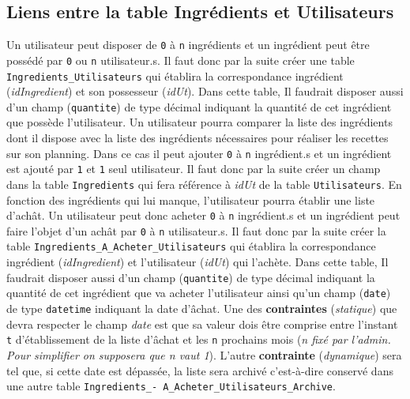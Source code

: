 \subsection{Liens entre la table Ingrédients et Utilisateurs}
Un utilisateur peut disposer de \texttt{0} à \texttt{n} ingrédients et un ingrédient peut être possédé par \texttt{0} ou \texttt{n} utilisateur.s. Il faut donc par la suite créer une table \texttt{Ingredients\_Utilisateurs} qui établira la correspondance ingrédient (\textit{idIngredient}) et son possesseur (\textit{idUt}).
Dans cette table, Il faudrait disposer aussi d'un champ (\texttt{quantite}) de type décimal indiquant la quantité de cet ingrédient que possède l'utilisateur.
\newline
Un utilisateur pourra comparer la liste des ingrédients dont il dispose avec la liste des ingrédients nécessaires pour réaliser les recettes sur son planning. Dans ce cas il peut ajouter \texttt{0} à \texttt{n} ingrédient.s et un ingrédient est ajouté par \texttt{1} et \texttt{1} seul utilisateur. 
\newline
Il faut donc par la suite créer un champ dans la table \texttt{Ingredients} qui fera référence à \textit{idUt} de la table \texttt{Utilisateurs}.
\newline
En fonction des ingrédients qui lui manque, l'utilisateur pourra établir une liste d'achât. Un utilisateur peut donc acheter \texttt{0} à \texttt{n} ingrédient.s et un ingrédient peut faire l'objet d'un achât par \texttt{0} à \texttt{n} utilisateur.s. Il faut donc par la suite créer la table \texttt{Ingredients\_A\_Acheter\_Utilisateurs} qui établira la correspondance ingrédient (\textit{idIngredient}) et l'utilisateur (\textit{idUt}) qui l'achète.
\newline
Dans cette table, Il faudrait disposer aussi d'un champ (\texttt{quantite}) de type décimal indiquant la quantité de cet ingrédient que va acheter l'utilisateur ainsi qu'un champ (\texttt{date}) de type \texttt{datetime} indiquant la date d'âchat.
\newline
Une des \textbf{contraintes} (\textit{statique}) que devra respecter le champ \textit{date} est que sa valeur dois être comprise entre l'instant \texttt{t} d'établissement de la liste d'âchat et les \texttt{n} prochains mois (\textit{n fixé par l'admin. Pour simplifier on supposera que n vaut 1}). 
\newline
L'autre \textbf{contrainte} (\textit{dynamique}) sera tel que, si cette date est dépassée, la liste sera archivé c'est-à-dire conservé dans une autre table \texttt{Ingredients\_-
A\_Acheter\_Utilisateurs\_Archive}.


